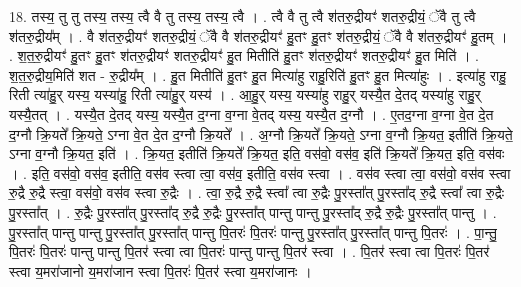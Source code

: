 \documentclass[17pt]{extarticle}
\begin{document}
18. तस्य॒ तु तु तस्य॒ तस्य॒ त्वै वै तु तस्य॒ तस्य॒ त्वै । . त्वै वै तु त्वै श॑तरु॒द्रीयꣳ॑ शतरु॒द्रीयं॒ ॅवै तु त्वै श॑तरु॒द्रीय᳚म् । . वै श॑तरु॒द्रीयꣳ॑ शतरु॒द्रीयं॒ ॅवै वै श॑तरु॒द्रीयꣳ॑ हु॒तꣳ हु॒तꣳ श॑तरु॒द्रीयं॒ ॅवै वै श॑तरु॒द्रीयꣳ॑ हु॒तम् । . श॒त॒रु॒द्रीयꣳ॑ हु॒तꣳ हु॒तꣳ श॑तरु॒द्रीयꣳ॑ शतरु॒द्रीयꣳ॑ हु॒त मितीति॑ हु॒तꣳ श॑तरु॒द्रीयꣳ॑ शतरु॒द्रीयꣳ॑ हु॒त मिति॑ । . श॒त॒रु॒द्रीय॒मिति॑ शत - रु॒द्रीय᳚म् । . हु॒त मितीति॑ हु॒तꣳ हु॒त मित्या॑हु राहु॒रिति॑ हु॒तꣳ हु॒त मित्या॑हुः । . इत्या॑हु राहु॒ रिती त्या॑हु॒र् यस्य॒ यस्या॑हु॒ रिती त्या॑हु॒र् यस्य॑ । . आ॒हु॒र् यस्य॒ यस्या॑हु राहु॒र् यस्यै॒त दे॒तद् यस्या॑हु राहु॒र् यस्यै॒तत् । . यस्यै॒त दे॒तद् यस्य॒ यस्यै॒त द॒ग्ना व॒ग्ना वे॒तद् यस्य॒ यस्यै॒त द॒ग्नौ । . ए॒तद॒ग्ना व॒ग्ना वे॒त दे॒त द॒ग्नौ क्रि॒यते᳚ क्रि॒यते॒ ऽग्ना वे॒त दे॒त द॒ग्नौ क्रि॒यते᳚ । . अ॒ग्नौ क्रि॒यते᳚ क्रि॒यते॒ ऽग्ना व॒ग्नौ क्रि॒यत॒ इतीति॑ क्रि॒यते॒ ऽग्ना व॒ग्नौ क्रि॒यत॒ इति॑ । . क्रि॒यत॒ इतीति॑ क्रि॒यते᳚ क्रि॒यत॒ इति॒ वस॑वो॒ वस॑व॒ इति॑ क्रि॒यते᳚ क्रि॒यत॒ इति॒ वस॑वः । . इति॒ वस॑वो॒ वस॑व॒ इतीति॒ वस॑व स्त्वा त्वा॒ वस॑व॒ इतीति॒ वस॑व स्त्वा । . वस॑व स्त्वा त्वा॒ वस॑वो॒ वस॑व स्त्वा रु॒द्रै रु॒द्रै स्त्वा॒ वस॑वो॒ वस॑व स्त्वा रु॒द्रैः । . त्वा॒ रु॒द्रै रु॒द्रै स्त्वा᳚ त्वा रु॒द्रैः पु॒रस्ता᳚त् पु॒रस्ता᳚द् रु॒द्रै स्त्वा᳚ त्वा रु॒द्रैः पु॒रस्ता᳚त् । . रु॒द्रैः पु॒रस्ता᳚त् पु॒रस्ता᳚द् रु॒द्रै रु॒द्रैः पु॒रस्ता᳚त् पान्तु पान्तु पु॒रस्ता᳚द् रु॒द्रै रु॒द्रैः पु॒रस्ता᳚त् पान्तु । . पु॒रस्ता᳚त् पान्तु पान्तु पु॒रस्ता᳚त् पु॒रस्ता᳚त् पान्तु पि॒तरः॑ पि॒तरः॑ पान्तु पु॒रस्ता᳚त् पु॒रस्ता᳚त् पान्तु पि॒तरः॑ । . पा॒न्तु॒ पि॒तरः॑ पि॒तरः॑ पान्तु पान्तु पि॒तर॑ स्त्वा त्वा पि॒तरः॑ पान्तु पान्तु पि॒तर॑ स्त्वा । . पि॒तर॑ स्त्वा त्वा पि॒तरः॑ पि॒तर॑ स्त्वा य॒मरा॑जानो य॒मरा॑जान स्त्वा पि॒तरः॑ पि॒तर॑ स्त्वा य॒मरा॑जानः । \newline
\end{document}
